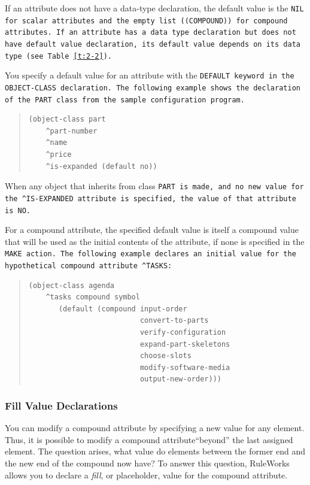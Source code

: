 If an attribute does not have a data-type declaration, the default
value is the \tt{NIL} for scalar attributes and the empty list
(\tt{(COMPOUND)}) for compound attributes. If an attribute has a data
type declaration but does not have default value declaration, its
default value depends on its data type (see Table~\ref{t:2-2}).

You specify a default value for an attribute with the \tt{DEFAULT}
keyword in the \tt{OBJECT-CLASS} declaration. The following
example shows the declaration of the \tt{PART} class from the
sample configuration program.

\begin{quote}
\begin{verbatim}
(object-class part
    ^part-number
    ^name
    ^price 
    ^is-expanded (default no))
\end{verbatim}
\end{quote}

When any object that inherits from class \tt{PART} is made, and no
new value for the \verb|^IS-EXPANDED| attribute is specified, the
value of that attribute is \tt{NO}.

For a compound attribute, the specified default value is
itself a compound value that will be used as the initial
contents of the attribute, if none is specified in the \tt{MAKE}
action. The following example declares an initial value for
the hypothetical compound attribute \verb|^TASKS|:

\begin{quote}
\begin{verbatim}
(object-class agenda
    ^tasks compound symbol
       (default (compound input-order
                          convert-to-parts
                          verify-configuration
                          expand-part-skeletons
                          choose-slots
                          modify-software-media
                          output-new-order)))
\end{verbatim}
\end{quote}

\subsubsection{Fill Value Declarations}

You can modify a compound attribute by specifying a new value for any
element. Thus, it is possible to modify a compound attribute``beyond''
the last assigned element. The question arises, what value do elements
between the former end and the new end of the compound now have? To
answer this question, RuleWorks allows you to declare a \emph{fill},
or placeholder, value for the compound attribute.


